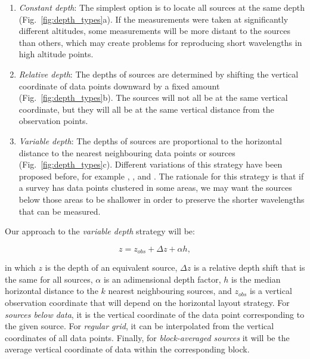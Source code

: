 \begin{enumerate}
  \item
    \emph{Constant depth}:
    The simplest option is to locate all sources at the same depth
    (Fig.~\ref{fig:depth_types}a).
    If the measurements were taken at significantly different altitudes, some
    measurements will be more distant to the sources than others,
    which may create problems for reproducing short wavelengths in high
    altitude points.
 \item
    \emph{Relative depth}:
    The depths of sources are determined by shifting the vertical coordinate of
    data points downward by a fixed amount (Fig.~\ref{fig:depth_types}b).
    The sources will not all be at the same vertical coordinate, but they will
    all be at the same vertical distance from the observation points.
 \item
    \emph{Variable depth}:
    The depths of sources are proportional to the horizontal distance to the
    nearest neighbouring data points or sources (Fig.~\ref{fig:depth_types}c).
    Different variations of this strategy have been proposed before, for
    example \citet{cordell1992}, \citet{guspi2004}, and \citet{guspi2009}.
    The rationale for this strategy is that if a survey has data points
    clustered in some areas, we may
    want the sources below those areas to be shallower in order to preserve the
    shorter wavelengths that can be measured.
\end{enumerate}

Our approach to the \emph{variable depth} strategy will be:

\begin{equation}
  z = z_{obs} + \Delta z + \alpha h,
  \label{eq:variable_depth}
\end{equation}

\noindent
in which $z$ is the depth of an equivalent source,
$\Delta z$ is a relative depth shift that is the same for all sources,
$\alpha$ is an adimensional depth factor,
$h$ is the median horizontal distance to the $k$ nearest neighbouring sources,
and
$z_{obs}$ is a vertical observation coordinate that will depend on the
horizontal layout strategy.
For \emph{sources below data}, it is the vertical coordinate of the data point
corresponding to the given source.
For \emph{regular grid}, it can be interpolated from the vertical coordinates
of all data points.
Finally, for \emph{block-averaged sources} it will be the average vertical
coordinate of data within the corresponding block.

